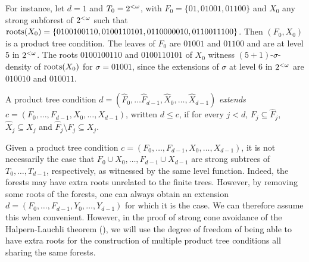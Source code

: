 For instance, let $d = 1$ and $T_0 = {2^{<\omega}}$,
with $F_0 = \{01, 01001, 01100\}$ and $X_0$ any strong subforest of ${2^{<\omega}}$
such that $\operatorname{roots}(X_0) = \{ 0100100110, 0100110101,\allowbreak 0110000010, 0110011100 \}$.
Then $(F_0, X_0)$ is a product tree condition. The leaves of $F_0$ are $01001$ and $01100$
and are at level 5 in ${2^{<\omega}}$. The roots $0100100110$ and $0100110101$ of $X_0$ witness $(5+1)$-$\sigma$-density of $\operatorname{roots}(X_0)$ for $\sigma = 01001$, since the extensions of $\sigma$ at level 6 in ${2^{<\omega}}$ are $010010$ and $010011$.

\begin{definition}\label{def:product-tree-extension}
A product tree condition $d = (\hat{F}_0, \dots \hat{F}_{d-1}, \hat{X}_0, \dots, \hat{X}_{d-1})$ \emph{extends} $c = (F_0, \dots, F_{d-1}, X_0, \dots, X_{d-1})$, written $d \leq c$,  if for every $j < d$, $F_j \subseteq \hat{F}_j$, $\hat{X}_j \subseteq X_j$ and $\hat{F}_j \setminus F_j \subseteq X_j$.
\end{definition}

\begin{remark}\label{remark:product-tree-condition-roots}
Given a product tree condition $c = (F_0, \dots, F_{d-1}, X_0, \dots,X_{d-1})$,
it is not necessarily the case that $F_0 \cup X_0, \dots, F_{d-1} \cup X_{d-1}$ are strong subtrees of $T_0, \dots, T_{d-1}$, respectively, as witnessed by the same level function.
Indeed, the forests may have extra roots unrelated to the finite trees.
However, by removing some roots of the forests, one can always obtain an extension
$d = (F_0, \dots, F_{d-1}, Y_0, \dots, Y_{d-1})$ for which it is the case. We can therefore assume this when convenient. However, in the proof of strong cone avoidance of the Halpern-Lauchli theorem (), we will use the degree of freedom of being able to have extra roots for {the} construction {of} multiple product tree conditions all sharing the same forests.
\end{remark}

